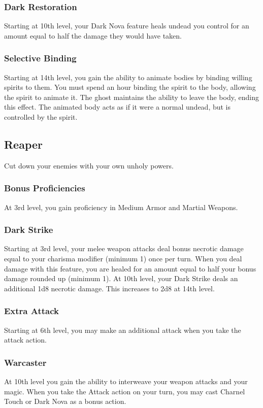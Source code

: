 \subsubsection{Dark Restoration}
Starting at 10th level, your Dark Nova feature heals undead you control for an amount equal to half the damage they would have taken.

\subsubsection{Selective Binding}
Starting at 14th level, you gain the ability to animate bodies by binding willing spirits to them. You must spend an hour binding the spirit to the body, allowing the spirit to animate it. The ghost maintains the ability to leave the body, ending this effect. The animated body acts as if it were a normal undead, but is controlled by the spirit.


\subsection{Reaper}
Cut down your enemies with your own unholy powers.

\subsubsection{Bonus Proficiencies}
At 3rd level, you gain proficiency in Medium Armor and Martial Weapons.

\subsubsection{Dark Strike}
Starting at 3rd level, your melee weapon attacks deal bonus necrotic damage equal to your charisma modifier (minimum 1) once per turn. When you deal damage with this feature, you are healed for an amount equal to half your bonus damage rounded up (minimum 1).
At 10th level, your Dark Strike deals an additional 1d8 necrotic damage. This increases to 2d8 at 14th level.

\subsubsection{Extra Attack}
Starting at 6th level, you may make an additional attack when you take the attack action.
\subsubsection{Warcaster}
At 10th level you gain the ability to interweave your weapon attacks and your magic. When you take the Attack action on your turn, you may cast Charnel Touch or Dark Nova as a bonus action.
